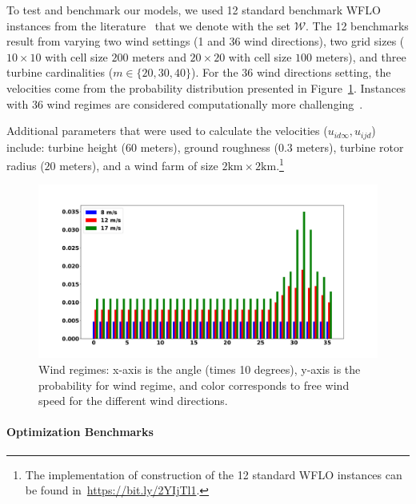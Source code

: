 \documentclass[preprint,12pt]{elsarticle}
\begin{document}
To test and benchmark our models, we used 12 standard benchmark WFLO instances
from the literature~\cite{MOSETTI1994105,Zhang2014,grady2005placement} that we denote with the set $\mathcal{W}$. 
The 12 benchmarks result from varying two wind settings (1 and 36 wind directions),
two grid sizes ($10\times10$ with cell size $200$ meters and $20\times20$ with cell size $100$ meters),
and three turbine cardinalities ($m \in \{20, 30, 40\}$). 
For the $36$ wind directions setting, the velocities come from the probability distribution presented in Figure~\ref{fig:prob_wind}.
Instances with $36$ wind regimes are considered computationally more challenging~\cite{Zhang2014}.

Additional parameters that were used to calculate 
the velocities ($u_{id\infty}, u_{ijd}$) include: turbine height ($60$ meters),
ground roughness ($0.3$ meters), turbine rotor radius ($20$ meters), and a wind farm of size $2 \mbox{km} \times 2 \mbox{km}$.\footnote{The implementation of construction of the 12 standard WFLO instances can be found in~\url{https://bit.ly/2YIjTl1}.}


\begin{figure}[t]
	\centering
	\includegraphics[scale = 0.3]{prob_wind_pdf.pdf}
	
	\caption{Wind regimes: x-axis is the angle (times 10 degrees), y-axis is the probability for wind regime, and color corresponds to free wind speed for the different wind directions.}\label{fig:prob_wind}
\end{figure}

\paragraph{Optimization Benchmarks}
\end{document}
